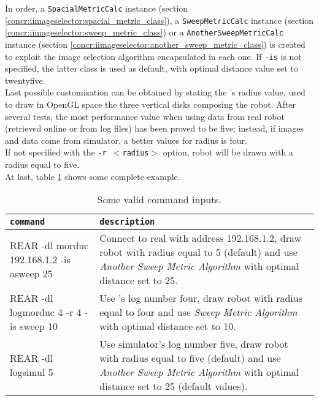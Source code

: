 In order, a \texttt{SpacialMetricCalc} instance
(section \ref{concr:iimageselector:spacial_metric_class}),
a \texttt{SweepMetricCalc} instance
(section \ref{concr:iimageselector:sweep_metric_class}) or
a \texttt{AnotherSweepMetricCalc} instance
(section \ref{concr:iimageselector:another_sweep_metric_class})
is created to exploit the image selection algorithm encapsulated
in each one. If \texttt{-is} is not specified, the latter class
is used as default, with optimal distance value set to twentyfive.
\\
Last possible customization can be obtained by stating the
\morduc{}'s radius value, used to draw in OpenGL space the three
vertical disks composing the robot. After several tests, the
most performance value when using data from real \morduc{} robot
(retrieved online or from log files) has been proved to be five; 
instead, if images and data come from simulator, a better
values for \morduc{} radius is four.
\\
If not specified with the \texttt{-r $<$radius$>$} option, robot
will be drawn with a radius equal to five.
\\
At last, table \ref{table:validopts} shows some complete example.

\begin{table}[!h]
  \centering  
  \begin{tabular}{| l | l |}

    \hline
    \texttt{command} &
    \texttt{description} \\

    \hline
    \small {REAR -dl morduc 192.168.1.2 -is asweep 25} &
    \parbox[t]{6cm}{\raggedright \small
      Connect to real \morduc{} with address 192.168.1.2, draw robot
      with radius equal to 5 (default) and use \textit{Another Sweep
      Metric Algorithm} with optimal distance set to 25.} \\  [1ex]

    \hline
    \small {REAR -dl logmorduc 4 -r 4 -is sweep 10} &
    \parbox[t]{6cm}{\raggedright \small
      Use \morduc{}'s log number four, draw robot
      with radius equal to four and use \textit{Sweep
      Metric Algorithm} with optimal distance set to 10.} \\  [1ex]

    \hline
    \small {REAR -dl logsimul 5} &
    \parbox[t]{6cm}{\raggedright \small
      Use simulator's log number five, draw robot
      with radius equal to five (default) and use \textit{Another Sweep
      Metric Algorithm} with optimal distance set to 25 (default values).} \\  [1ex]


    \hline

  \end{tabular}
  \caption{Some valid command inputs.}
  \label{table:validopts}
\end{table}
